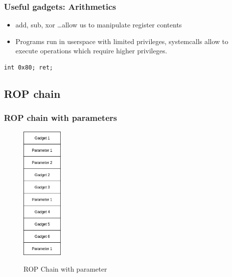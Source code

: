 \documentclass[11pt]{beamer}
\begin{document}
\begin{frame}[fragile]
    \frametitle{Useful gadgets: Arithmetics}
    \begin{itemize}
        \item add, sub, xor \ldots allow us to manipulate register contents
        \item Programs run in userspace with limited privileges, systemcalls allow to execute operations which require higher privileges.
    \end{itemize}
\begin{lstlisting}[style=result]
int 0x80; ret;
\end{lstlisting}
\end{frame}
\subsection{ROP chain}
\begin{frame}
    \frametitle{ROP chain with parameters}
    \begin{figure}[h]
        \caption{ROP Chain with parameter}
        \centering
        \includegraphics[width=0.18\textwidth]{./img/gadgetstack.png}\label{gadget2}
    \end{figure}
\end{frame}
\end{document}
